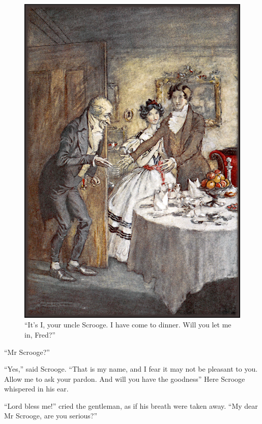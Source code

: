 \documentclass[paper=5.5in:8.5in,BCOR=10mm,twoside,DIV=15,12pt,usegeometry,openany]{scrbook} %
\begin{document}
\begin{figure}[p]
\begin{minipage}[c]{\linewidth}
\includegraphics[width=\linewidth]{freddinner}
\caption*{\enquote{It's I, your uncle Scrooge. I have come to dinner. Will you let me in, Fred?}}
\end{minipage}
\end{figure}

\enquote{Mr Scrooge?}

\enquote{Yes,} said Scrooge. \enquote{That is my name, and I fear it may not be pleasant to you. Allow me to ask your pardon. And will you have the goodness\textemdash \textemdash } Here Scrooge whispered in his ear.

\enquote{Lord bless me!} cried the gentleman, as if his breath were taken away. \enquote{My dear Mr Scrooge, are you serious?}
\end{document}

